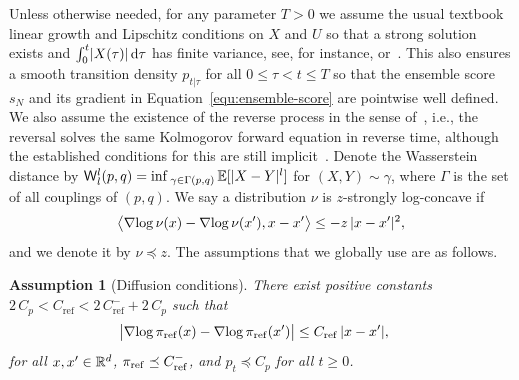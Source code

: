 \documentclass{article}
\newtheorem{assumption}{Assumption}
\begin{document}
Unless otherwise needed, for any parameter $T>0$ we assume the usual textbook linear growth and Lipschitz conditions on $X$ and $U$ so that a strong solution exists and $\int^t_0 \lvert X(\tau)\rvert \mathop{}\!\mathrm{d} \tau$ has finite variance, see, for instance, \citet[][pp. 289]{Karatzas1991} or~\citet[][Thm. 5.2.1]{Oksendal2003}. 
This also ensures a smooth transition density $p_{t|\tau}$ for all $0\leq \tau < t\leq T $ so that the ensemble score $s_N$ and its gradient in Equation~\eqref{equ:ensemble-score} are pointwise well defined. 
We also assume the existence of the reverse process in the sense of~\citet{Anderson1982}, i.e., the reversal solves the same Kolmogorov forward equation in reverse time, although the established conditions for this are still implicit~\citep[see, e.g.,][]{Haussmann1986, Millet1989}.
Denote the Wasserstein distance by $\mathsf{W}_l^l(p, q) = \inf_{\gamma \in\Gamma(p, q)}\expec{\abs{X - Y}^l}$ for $(X, Y) \sim \gamma$, where $\Gamma$ is the set of all couplings of $(p, q)$. 
We say a distribution $\nu$ is $z$-strongly log-concave if
%
\begin{equation*}
    \bigl\langle \operatorname{\nabla\!}\log \nu(x) - \operatorname{\nabla\!}\log \nu(x'), x-x' \bigr\rangle \leq -z \, \lvert x - x'\rvert^2,
\end{equation*}
%
and we denote it by $\nu \preceq z$. 
The assumptions that we globally use are as follows. 

\begin{assumption}[Diffusion conditions]
    \label{assumption:diffusion}
    There exist positive constants $2 \, C_p < C_{\mathrm{ref}} < 2 \, C_{\mathrm{ref}}^- + 2 \, C_p$ such that
    \begin{equation*}
        \begin{split}
            \bigl \lvert \operatorname{\nabla\!}\log \pi_{\mathrm{ref}}(x) - \operatorname{\nabla\!}\log \pi_{\mathrm{ref}}(x') \bigr\rvert &\leq C_{\mathrm{ref}} \, \lvert x - x'\rvert, 
        \end{split}
    \end{equation*}
    for all $x, x'\in\mathbb{R}^d$, $\pi_{\mathrm{ref}} \preceq C_{\mathrm{ref}}^-$, and $p_t \preceq C_p$ for all $t\geq 0$.
\end{assumption}
\end{document}
